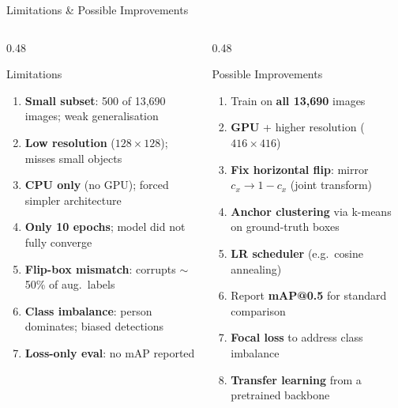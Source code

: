 \documentclass[aspectratio=169, 10pt]{beamer}
\begin{document}
\begin{frame}{Limitations \& Possible Improvements}
\begin{columns}[T]
\begin{column}{0.48\textwidth}
  \begin{block}{Limitations}
    \begin{enumerate}
      \item \textbf{Small subset}: 500 of 13,690 images; weak generalisation
      \item \textbf{Low resolution} ($128\times128$); misses small objects
      \item \textbf{CPU only} (no GPU); forced simpler architecture
      \item \textbf{Only 10 epochs}; model did not fully converge
      \item \textbf{Flip-box mismatch}: corrupts $\sim$50\% of aug.\ labels
      \item \textbf{Class imbalance}: person dominates; biased detections
      \item \textbf{Loss-only eval}: no mAP reported
    \end{enumerate}
  \end{block}
\end{column}
\begin{column}{0.48\textwidth}
  \begin{alertblock}{Possible Improvements}
    \begin{enumerate}
      \item Train on \textbf{all 13,690} images
      \item \textbf{GPU} + higher resolution ($416\times416$)
      \item \textbf{Fix horizontal flip}: mirror $c_x \to 1-c_x$ (joint transform)
      \item \textbf{Anchor clustering} via k-means on ground-truth boxes
      \item \textbf{LR scheduler} (e.g.\ cosine annealing)
      \item Report \textbf{mAP@0.5} for standard comparison
      \item \textbf{Focal loss} to address class imbalance
      \item \textbf{Transfer learning} from a pretrained backbone
    \end{enumerate}
  \end{alertblock}
\end{column}
\end{columns}
\end{frame}
\end{document}
